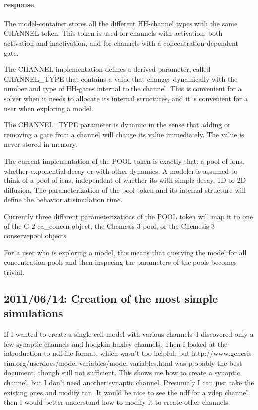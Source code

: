 \documentclass[12pt]{article}
\begin{document}
\paragraph{response} The model-container stores all the different
HH-channel types with the same CHANNEL token.  This token is used for
channels with activation, both activation and inactivation, and for
channels with a concentration dependent gate.

The CHANNEL implementation defines a derived parameter, called
CHANNEL\_TYPE that contains a value that changes dynamically with the
number and type of HH-gates internal to the channel.  This is
convenient for a solver when it needs to allocate its internal
structures, and it is convenient for a user when exploring a model.

The CHANNEL\_TYPE parameter is dynamic in the sense that adding or
removing a gate from a channel will change its value immediately.  The
value is never stored in memory.

The current implementation of the POOL token is exactly that: a pool
of ions, whether exponential decay or with other dynamics.  A modeler
is assumed to think of a pool of ions, independent of whether its with
simple decay, 1D or 2D diffusion.  The parameterization of the pool
token and its internal structure will define the behavior at
simulation time.

Currently three different parameterizations of the POOL token will map
it to one of the G-2 ca\_concen object, the Chemesis-3 pool, or the
Chemesis-3 conservepool objects.

For a user who is exploring a model, this means that querying the
model for all concentration pools and then inspecing the parameters of
the pools becomes trivial.


\subsection{2011/06/14: Creation of the most simple simulations}

If I wanted to create a single cell model with various channels. I
discovered only a few synaptic channels and hodgkin-huxley channels.
Then I looked at the introduction to ndf file format, which wasn't too
helpful, but
http://www.genesis-sim.org/userdocs/model-variables/model-variables.html
was probably the best document, though still not sufficient.  This
shows me how to create a synaptic channel, but I don't need another
synaptic channel.  Presumaly I can just take the existing ones and
modify tau.  It would be nice to see the ndf for a vdep channel, then
I would better understand how to modify it to create other channels.
\end{document}
